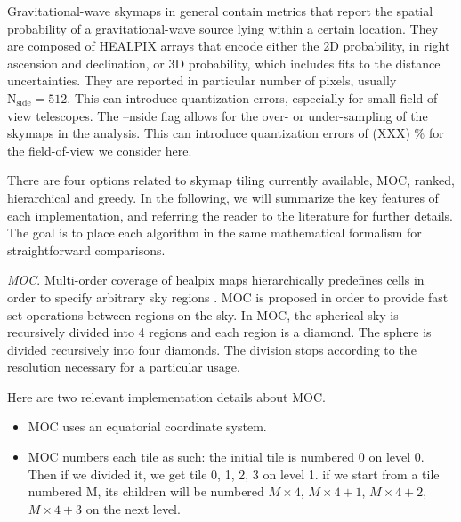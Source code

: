 \documentclass[twocolumn]{aastex61}
\newcommand{\rednote}[1]{{\color{red} (#1)}}
\begin{document}
Gravitational-wave skymaps in general contain metrics that report the spatial probability of a gravitational-wave source lying within a certain location.
They are composed of HEALPIX arrays that encode either the 2D probability, in right ascension and declination, or 3D probability, which includes fits to the distance uncertainties.
They are reported in particular number of pixels, usually $\textrm{N}_\textrm{side} = 512$. 
This can introduce quantization errors, especially for small field-of-view telescopes. 
The --nside flag allows for the over- or under-sampling of the skymaps in the analysis.
This can introduce quantization errors of \rednote{XXX} \% for the field-of-view we consider here.

There are four options related to skymap tiling currently available, MOC, ranked, hierarchical and greedy.
In the following, we will summarize the key features of each implementation, and referring the reader to the literature for further details.
The goal is to place each algorithm in the same mathematical formalism for straightforward comparisons.

\emph{MOC}. Multi-order coverage of healpix maps hierarchically predefines cells in order to specify arbitrary sky regions \citep{FeBo2014}. MOC is proposed in order to provide fast set operations between regions on the sky. In MOC, the spherical sky is recursively divided into 4 regions and each region is a diamond. %
The sphere is divided recursively into four diamonds. 
The division stops according to the resolution necessary for a particular usage.

Here are two relevant implementation details about MOC.
\begin{itemize}
\item MOC uses an equatorial coordinate system. 
\item MOC numbers each tile as such: the initial tile is numbered 0 on level 0. Then if we divided it, we get tile 0, 1, 2, 3 on level 1. if we start from a tile numbered M, its children will be numbered $M\times 4$, $M\times 4 + 1$, $M\times 4 + 2$,$M\times 4 + 3$ on the next level.
\end{itemize}
\end{document}
